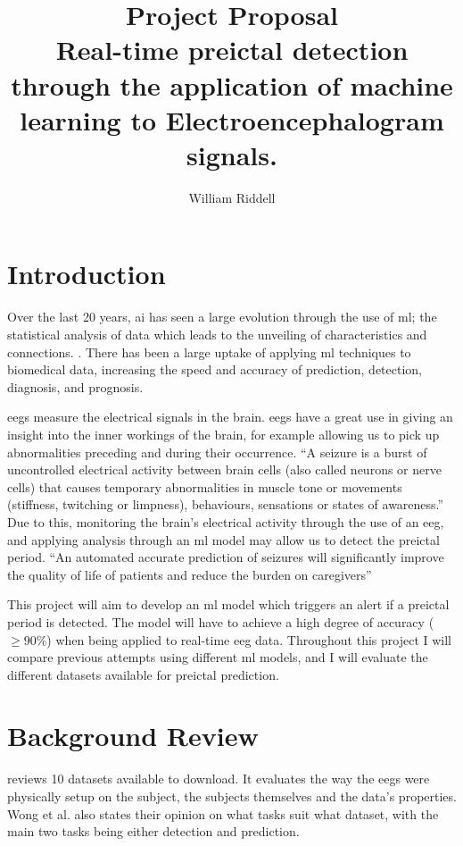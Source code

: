\documentclass[12pt]{article}
\title{Project Proposal \\ Real-time preictal detection through the application of machine learning to Electroencephalogram signals.}
\author{William Riddell}
\begin{document}
\maketitle
\pagebreak
\tableofcontents
\pagebreak

\section{Introduction}

Over the last 20 years, \acrfull{ai} has seen a large evolution through the use of \acrfull{ml}; the statistical analysis of data which leads to the unveiling of characteristics and connections. \cite{awad2015efficient}. There has been a large uptake of applying \acrshort{ml} techniques to biomedical data, increasing the speed and accuracy of prediction, detection, diagnosis, and prognosis. 

\acrfull{eegs} measure the electrical signals in the brain. \acrshort{eegs} have a great use in giving an insight into the inner workings of the brain, for example allowing us to pick up abnormalities preceding and during their occurrence. ``A seizure is a burst of uncontrolled electrical activity between brain cells (also called neurons or nerve cells) that causes temporary abnormalities in muscle tone or movements (stiffness, twitching or limpness), behaviours, sensations or states of awareness.'' \cite{johnHopkinsTypesOfSeizures} Due to this, monitoring the brain's electrical activity through the use of an \acrshort{eeg}, and applying analysis through an \acrshort{ml} model may allow us to detect the preictal period. ``An automated accurate prediction of seizures will significantly improve the quality of life of patients and reduce the burden on caregivers'' \cite{acharya2018automated}

This project will aim to develop an \acrshort{ml} model which triggers an alert if a preictal period is detected. The model will have to achieve a high degree of accuracy ($\geq90\%$) when being applied to real-time \acrshort{eeg} data. Throughout this project I will compare previous attempts using different \acrshort{ml} models, and I will evaluate the different datasets available for preictal prediction. 


\section{Background Review}


\cite{wong2023eeg} reviews 10 datasets available to download. It evaluates the way the \acrshort{eegs} were physically setup on the subject, the subjects themselves and the data's properties. Wong et al. also states their opinion on what tasks suit what dataset, with the main two tasks being either detection and prediction. 
\end{document}
